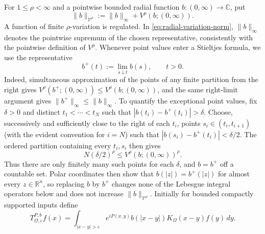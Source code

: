 \documentclass[11pt]{article}
\numberwithin{equation}{section}
\theoremstyle{remark}
\theoremstyle{definition}
\begin{document}
For $1\le\rho<\infty$ and a pointwise bounded radial function
$b:(0,\infty)\to\mathbb C$, put
\begin{equation}\label{eq:radial-variation-norm}
 \|b\|_{\mathcal V^\rho}
 :=\|b\|_\infty+V^\rho(b;(0,\infty)).
\end{equation}
A function of finite $\rho$-variation is regulated.  In
\eqref{eq:radial-variation-norm}, $\|b\|_\infty$ denotes the pointwise
supremum of the chosen representative, consistently with the pointwise
definition of $V^\rho$.  Whenever point values enter a Stieltjes formula,
we use the representative
\[
 b^+(t):=\lim_{s\downarrow t}b(s),\qquad t>0.
\]
Indeed, simultaneous approximation of the points of any finite partition
from the right gives
$V^\rho(b^+;(0,\infty))\le V^\rho(b;(0,\infty))$, and the same
right-limit argument gives $\|b^+\|_\infty\le\|b\|_\infty$.  To quantify
the exceptional point values, fix $\delta>0$ and distinct
$t_1<\cdots<t_N$ such that $|b(t_i)-b^+(t_i)|>\delta$.  Choose, successively
and sufficiently close to the right of each $t_i$, points
$s_i\in(t_i,t_{i+1})$ (with the evident convention for $i=N$) such that
$|b(s_i)-b^+(t_i)|<\delta/2$.  The ordered partition containing every
$t_i,s_i$ then gives
\[
 N(\delta/2)^\rho\le V^\rho(b;(0,\infty))^\rho.
\]
Thus there are only finitely many such points for each $\delta$, and
$b=b^+$ off a countable set.  Polar
coordinates then show that $b(|z|)=b^+(|z|)$ for almost every
$z\in\mathbb R^n$, so replacing $b$ by $b^+$ changes none of the
Lebesgue integral operators below and does not increase
$\|b\|_{\mathcal V^\rho}$.
Initially for bounded compactly supported inputs define
\[
 T^{P,b}_{\Omega,\varepsilon}f(x)
 =\int_{|x-y|>\varepsilon}e^{iP(x,y)}b(|x-y|)
 K_\Omega(x-y)f(y)\,dy.
\]
\end{document}
